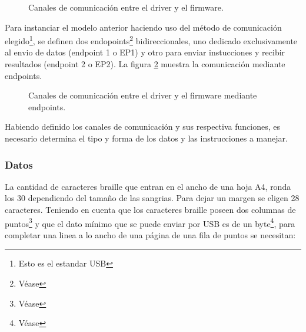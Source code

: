 \begin{figure}[htp]
\centering
{}
\caption{Canales de comunicaci\'on entre el driver y el firmware.}
\label{fig:driver_firmware}
\end{figure}


Para instanciar el modelo anterior haciendo uso del m\'etodo de comunicaci\'on
elegido\footnote{Esto es el estandar USB}, se definen dos
endopoints\footnote{V\'ease } bidireccionales, uno
dedicado exclusivamente al envio de datos (endpoint 1 o EP1) y otro para enviar
instucciones y recibir resultados (endpoint 2 o EP2). La figura
\ref{fig:driver_eps_firmware} muestra la comunicaci\'on mediante endpoints.


\begin{figure}[htp]
\centering
{}
\caption{Canales de comunicaci\'on entre el driver y el firmware mediante
endpoints.}
\label{fig:driver_eps_firmware}
\end{figure}

Habiendo definido los canales de comunicaci\'on y sus respectiva funciones, es
necesario determina el tipo y forma de los datos y las instrucciones a manejar.

\subsubsection{Datos}
%
La cantidad de caracteres braille que entran en el ancho de una hoja A4, ronda
los 30 dependiendo del tama\~no de las sangrias. Para dejar un margen se eligen
28 caracteres. Teniendo en cuenta que los caracteres braille poseen dos
columnas de puntos\footnote{V\'ease } y que el
dato m\'inimo que se puede enviar por USB es de un byte\footnote{V\'ease
}, para completar una linea a lo ancho de una p\'agina de
una fila de puntos se necesitan:


